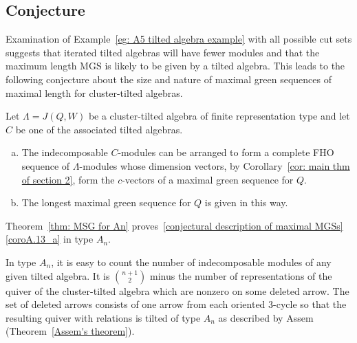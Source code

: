 \documentclass[ALCO,ThmDefs,Unicode,epreuves]{cedram}
\begin{document}
\subsection{Conjecture} 


Examination of Example~\ref{eg: A5 tilted algebra example} with all possible cut sets suggests that iterated tilted algebras will have fewer modules and that the maximum length MGS is likely to be given by a tilted algebra. This leads to the following conjecture about the size and nature of maximal green sequences of maximal length for cluster-tilted algebras.

\begin{conj}[I-Todorov]\label{conjectural description of maximal MGSs}
Let $\Lambda=J(Q,W)$ be a cluster-tilted algebra of finite representation type and let $C$ be one of the associated tilted algebras.
\begin{enumerate}[(a)]
\item\label{coroA.13_a} %
The indecomposable $C$-modules can be arranged to form a complete FHO sequence of $\Lambda$-modules whose dimension vectors, by Corollary~\ref{cor: main thm of section 2}, form the $c$-vectors of a maximal green sequence for $Q$.
\item\label{coroA.13_b} %
The longest maximal green sequence for $Q$ is given in this way.
\end{enumerate}
\end{conj}

Theorem~\ref{thm: MSG for An} proves~\ref{conjectural description of maximal MGSs}\ref{coroA.13_a} in type $A_n$. 


In type $A_n$, it is easy to count the number of indecomposable modules of any given tilted algebra. It is $\binom {n+1}2$ minus the number of representations of the quiver of the cluster-tilted algebra which are nonzero on some deleted arrow. The set of deleted arrows consists of one arrow from each oriented 3-cycle so that the resulting quiver with relations is tilted of type $A_n$ as described by Assem (Theorem~\ref{Assem's theorem}).
\end{document}
